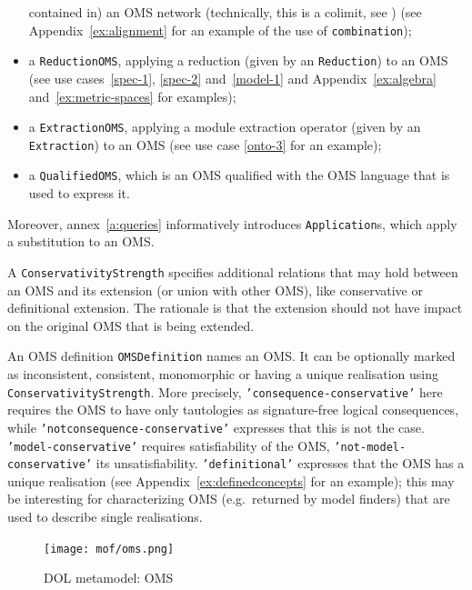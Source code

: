 \documentclass[10pt, a4paper]{isov2}
\newcommand*{\syntax}[1]{\texttt{#1}}
\begin{document}
\begin{itemize}
  contained in) an OMS network (technically, this is a colimit, see
  \cite{ZimmermanEtAl06}) 
  (see Appendix~\ref{ex:alignment} for an example of the use of \syntax{combination});
\item a \syntax{ReductionOMS}, applying a reduction
(given by an \syntax{Reduction}) to an OMS (see use cases~\ref{spec-1}, \ref{spec-2} and~\ref{model-1} and Appendix~\ref{ex:algebra} and~\ref{ex:metric-spaces} for examples);
\item a \syntax{ExtractionOMS}, applying a module extraction operator
(given by an \syntax{Extraction}) to an OMS
 (see use case \ref{onto-3} for an example);
\item a \syntax{QualifiedOMS}, which is an OMS qualified with the OMS
  language that is used to express it.
\end{itemize}
Moreover, annex~\ref{a:queries}
informatively introduces \syntax{Application}s, which apply a substitution
to an OMS.

A \syntax{ConservativityStrength} specifies additional relations that
may hold between an OMS and its extension (or union with other OMS),
like conservative or definitional extension. The rationale is that the
extension should not have impact on the original OMS that is being
extended. 

An OMS definition \syntax{OMSDefinition} names an OMS.  It can be
optionally marked as inconsistent, consistent, monomorphic or having a
unique realisation using \syntax{ConservativityStrength}. More precisely,
\syntax{'consequence-conservative'} here requires the OMS to have only
tautologies as signature-free logical consequences, while
\syntax{'not\-consequence-conservative'} expresses that this is not
the case.  \syntax{'model-conservative'} requires satisfiability of
the OMS, \syntax{'not-model-conservative'} its unsatisfiability.
\syntax{'de\-fi\-nitional'} expresses that the OMS has a unique
realisation (see Appendix~\ref{ex:definedconcepts} for an example); this may be interesting for characterizing OMS
(e.g.\ returned by model finders) that are used to describe single
realisations.



\begin{figure}
  \centering

    \texttt{[image: mof/oms.png]}
  \caption{DOL metamodel: OMS}
  \label{fig:oms}
  	
\end{figure}
\end{document}
